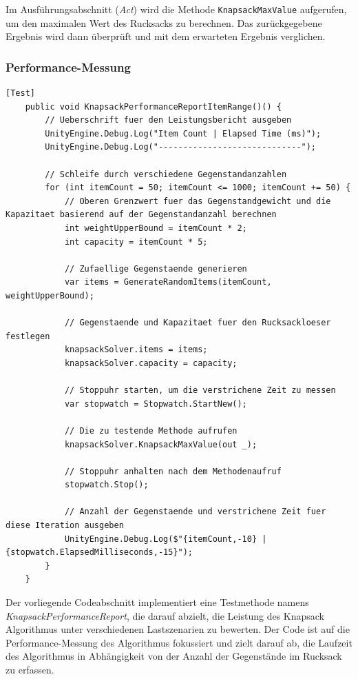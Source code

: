 \begin{itemize}
Im Ausführungsabschnitt (\textit{Act}) wird die Methode \texttt{KnapsackMaxValue} aufgerufen, um den maximalen Wert des Rucksacks zu berechnen. Das zurückgegebene Ergebnis wird dann überprüft und mit dem erwarteten Ergebnis verglichen.

\subsubsection{Performance-Messung}

\begin{lstlisting}[style=csharp, caption={Codeabschnitt: Performance Messung bei hoher Anzahl an Gegenständen}, label={code:performanceRange}]
    [Test]
    public void KnapsackPerformanceReportItemRange()() {
        // Ueberschrift fuer den Leistungsbericht ausgeben
        UnityEngine.Debug.Log("Item Count | Elapsed Time (ms)");
        UnityEngine.Debug.Log("-----------------------------");

        // Schleife durch verschiedene Gegenstandanzahlen
        for (int itemCount = 50; itemCount <= 1000; itemCount += 50) {
            // Oberen Grenzwert fuer das Gegenstandgewicht und die Kapazitaet basierend auf der Gegenstandanzahl berechnen
            int weightUpperBound = itemCount * 2;
            int capacity = itemCount * 5;

            // Zufaellige Gegenstaende generieren
            var items = GenerateRandomItems(itemCount, weightUpperBound);

            // Gegenstaende und Kapazitaet fuer den Rucksackloeser festlegen
            knapsackSolver.items = items;
            knapsackSolver.capacity = capacity;

            // Stoppuhr starten, um die verstrichene Zeit zu messen
            var stopwatch = Stopwatch.StartNew();

            // Die zu testende Methode aufrufen
            knapsackSolver.KnapsackMaxValue(out _);

            // Stoppuhr anhalten nach dem Methodenaufruf
            stopwatch.Stop();

            // Anzahl der Gegenstaende und verstrichene Zeit fuer diese Iteration ausgeben
            UnityEngine.Debug.Log($"{itemCount,-10} | {stopwatch.ElapsedMilliseconds,-15}");
        }
    }
\end{lstlisting}

Der vorliegende Codeabschnitt implementiert eine Testmethode namens \textit{KnapsackPerformanceReport}, die darauf abzielt, die Leistung des Knapsack Algorithmus unter verschiedenen Lastszenarien zu bewerten. Der Code ist auf die Performance-Messung des Algorithmus fokussiert und zielt darauf ab, die Laufzeit des Algorithmus in Abhängigkeit von der Anzahl der Gegenstände im Rucksack zu erfassen.


\end{itemize}
